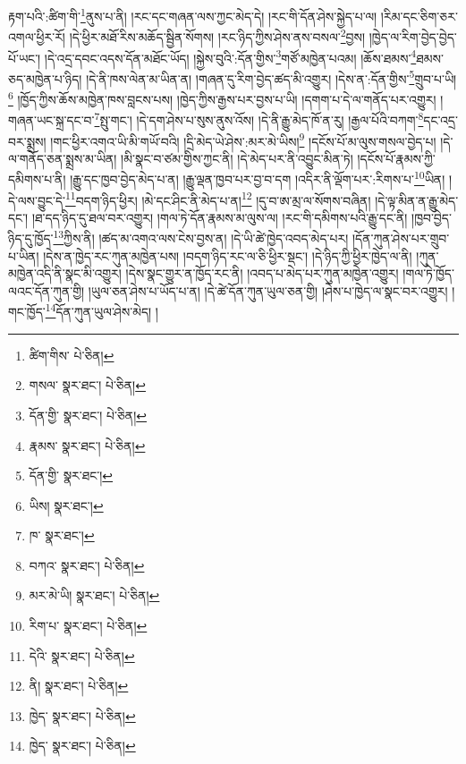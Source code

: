 རྟག་པའི་:ཚིག་གི་\footnote{ཚིག་གིས་  པེ་ཅིན། }ནུས་པ་ནི། །རང་དང་གཞན་ལས་ཀྱང་མེད་དེ། །རང་གི་དོན་ཤེས་སྐྱེད་པ་ལ། །རིམ་དང་ཅིག་ཅར་འགལ་ཕྱིར་རོ། །དེ་ཕྱིར་མཐོ་རིས་མཆོད་སྦྱིན་སོགས། །རང་ཉིད་ཀྱིས་ཤེས་ནས་བསལ་\footnote{གསལ་  སྣར་ཐང་།  པེ་ཅིན། }བྱས། །ཁྱེད་ལ་རིག་བྱེད་བྱེད་པོ་ཡང་། །དེ་འདྲ་དབང་འདས་དོན་མཐོང་ཡོད། །སྐྱེས་བུའི་:དོན་གྱིས་\footnote{དོན་གྱི་  སྣར་ཐང་།  པེ་ཅིན། }གཙོ་མཁྱེན་པའམ། །ཆོས་ཐམས་\footnote{རྣམས་  སྣར་ཐང་།  པེ་ཅིན། }ཐམས་ཅད་མཁྱེན་པ་ཉིད། །དེ་ནི་ཁས་ལེན་མ་ཡིན་ན། །གཞན་དུ་རིག་བྱེད་ཚད་མི་འགྱུར། །དེས་ན་:དོན་གྱིས་\footnote{དོན་གྱི་  སྣར་ཐང་། }གྲུབ་པ་ཡི།\footnote{ཡིས།  སྣར་ཐང་། } །ཁྱོད་ཀྱིས་ཆོས་མཁྱེན་ཁས་བླངས་པས། །ཁྱེད་ཀྱིས་རྒྱས་པར་བྱས་པ་ཡི། །དགག་པ་དེ་ལ་གནོད་པར་འགྱུར། །གཞན་ཡང་སྐྲ་དང་བ་\footnote{ཁ་  སྣར་ཐང་། }སྤུ་གང་། །དེ་དག་ཤེས་པ་སུས་ནུས་འོས། །དེ་ནི་རྒྱུ་མེད་ཁོ་ན་རུ། །རྒྱལ་པོའི་བཀག་\footnote{བཀའ་  སྣར་ཐང་།  པེ་ཅིན། }དང་འདྲ་བར་སྨྲས། །གང་ཕྱིར་འགའ་ཡི་མི་གཡོ་བའི། །དྲི་མེད་ཡེ་ཤེས་:མར་མེ་ཡིས།\footnote{མར་མེ་ཡི།  སྣར་ཐང་།  པེ་ཅིན། } །དངོས་པོ་མ་ལུས་གསལ་བྱེད་པ། །དེ་ལ་གནོད་ཅན་སྨྲས་མ་ཡིན། །མི་སྣང་བ་ཙམ་གྱིས་ཀྱང་ནི། །དེ་མེད་པར་ནི་འབྱུང་མིན་ཏེ། །དངོས་པོ་རྣམས་ཀྱི་དམིགས་པ་ནི། །རྒྱུ་དང་ཁྱབ་བྱེད་མེད་པ་ན། །རྒྱུ་ལྡན་ཁྱབ་པར་བྱ་བ་དག །འདིར་ནི་ལྡོག་པར་:རིགས་པ་\footnote{རིག་པ་  སྣར་ཐང་།  པེ་ཅིན། }ཡིན། །དེ་ལས་བྱུང་དེ་\footnote{དེའི་  སྣར་ཐང་།  པེ་ཅིན། }བདག་ཉིད་ཕྱིར། །མེ་དང་ཤིང་ནི་མེད་པ་ན།\footnote{ནི།  སྣར་ཐང་།  པེ་ཅིན། } །དུ་བ་ཨ་མྲ་ལ་སོགས་བཞིན། །དེ་ལྟ་མིན་ན་རྒྱུ་མེད་དང་། །ཐ་དད་ཉིད་དུ་ཐལ་བར་འགྱུར། །གལ་ཏེ་དོན་རྣམས་མ་ལུས་ལ། །རང་གི་དམིགས་པའི་རྒྱུ་དང་ནི། །ཁྱབ་བྱེད་ཉིད་དུ་ཁྱོད་\footnote{ཁྱེད་  སྣར་ཐང་།  པེ་ཅིན། }ཀྱིས་ནི། །ཚད་མ་འགའ་ལས་ངེས་བྱས་ན། །དེ་ཡི་ཚེ་ཁྱེད་འབད་མེད་པར། །དོན་ཀུན་ཤེས་པར་གྲུབ་པ་ཡིན། །དེས་ན་ཁྱེད་རང་ཀུན་མཁྱེན་པས། །བདག་ཉིད་རང་ལ་ཅི་ཕྱིར་སྡང་། །དེ་ཉིད་ཀྱི་ཕྱིར་ཁྱེད་ལ་ནི། །ཀུན་མཁྱེན་འདི་ནི་སྣང་མི་འགྱུར། །དེས་སྣང་གྱུར་ན་ཁྱོད་རང་ནི། །འབད་པ་མེད་པར་ཀུན་མཁྱེན་འགྱུར། །གལ་ཏེ་ཁྱོད་ལའང་དོན་ཀུན་གྱི། །ཡུལ་ཅན་ཤེས་པ་ཡོད་པ་ན། །དེ་ཚེ་དོན་ཀུན་ཡུལ་ཅན་གྱི། །ཤེས་པ་ཁྱེད་ལ་སྣང་བར་འགྱུར། །གང་ཁྱོད་\footnote{ཁྱེད་  སྣར་ཐང་།  པེ་ཅིན། }དོན་ཀུན་ཡུལ་ཤེས་མེད། །
